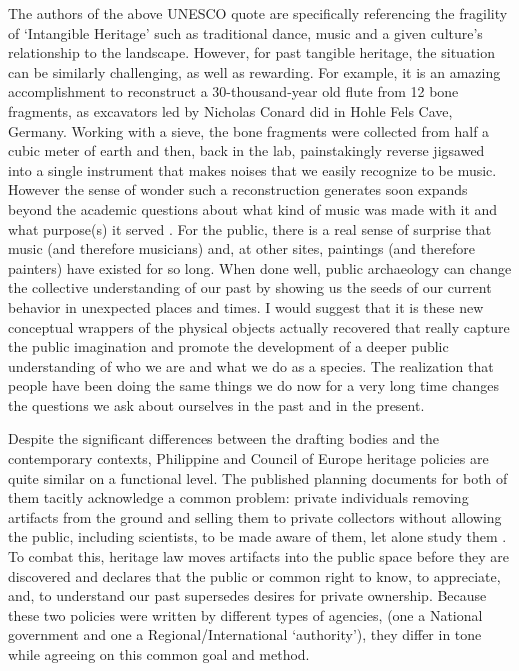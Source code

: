 The authors of the above UNESCO quote are specifically referencing the fragility of ‘Intangible Heritage’ such as traditional dance, music and a given culture’s relationship to the landscape. However, for past tangible heritage, the situation can be similarly challenging, as well as rewarding. For example, it is an amazing accomplishment to reconstruct a 30-thousand-year old flute from 12 bone fragments, as excavators led by Nicholas Conard did in Hohle Fels Cave, Germany. Working with a sieve, the bone fragments were collected from half a cubic meter of earth and then, back in the lab, painstakingly reverse jigsawed into a single instrument that makes noises that we easily recognize to be music.  However the sense of wonder such a reconstruction generates soon expands beyond the academic questions about what kind of music was made with it and what purpose(s) it served \parencite{Conard_2009}. 
For the public, there is a real sense of surprise that music (and therefore musicians) and, at other sites, paintings (and therefore painters) have existed for so long. When done well, public archaeology can change the collective understanding of our past by showing us the seeds of our current behavior in unexpected places and times. I would suggest that it is these new conceptual wrappers of the physical objects actually recovered that really capture the public imagination and promote the development of a deeper public understanding of who we are and what we do as a species. The realization that people have been doing the same things we do now for a very long time changes the questions we ask about ourselves in the past and in the present. 


Despite the significant differences between the drafting bodies and the contemporary contexts, Philippine and Council of Europe heritage policies are quite similar on a functional level. The published planning documents for both of them tacitly acknowledge a common problem: private individuals removing artifacts from the ground and selling them to private collectors without allowing the public, including scientists, to be made aware of them, let alone study them \parencites[2]{Valetta_1992}[18-20]{RA10066}. To combat this, heritage law moves artifacts into the public space before they are discovered and declares that the public or common right to know, to appreciate, and, to understand our past supersedes desires for private ownership. Because these two policies were written by different types of agencies, (one a National government and one a Regional/International ‘authority’), they differ in tone while agreeing on this common goal and method. 

